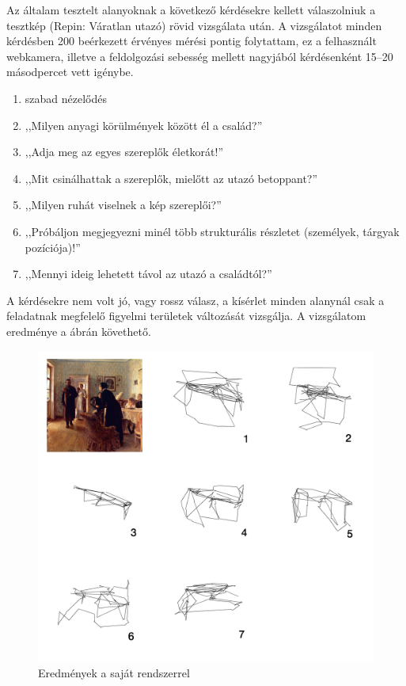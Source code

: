\bigskip

Az általam tesztelt alanyoknak a következő kérdésekre kellett válaszolniuk a tesztkép (Repin: Váratlan utazó) rövid vizsgálata után. A vizsgálatot minden kérdésben 200 beérkezett érvényes mérési pontig folytattam, ez a felhasznált webkamera, illetve a feldolgozási sebesség mellett nagyjából kérdésenként 15--20 másodpercet vett igénybe.

\begin{enumerate}
 \item szabad nézelődés
 \item ,,Milyen anyagi körülmények között él a család?''
 \item ,,Adja meg az egyes szereplők életkorát!''
 \item ,,Mit csinálhattak a szereplők, mielőtt az utazó betoppant?''
 \item ,,Milyen ruhát viselnek a kép szereplői?''
 \item ,,Próbáljon megjegyezni minél több strukturális részletet (személyek, tárgyak pozíciója)!''
 \item ,,Mennyi ideig lehetett távol az utazó a családtól?''
\end{enumerate}

A kérdésekre nem volt jó, vagy rossz válasz, a kísérlet minden alanynál csak a feladatnak megfelelő figyelmi területek változását vizsgálja. A vizsgálatom eredménye a  ábrán követhető.

\begin{figure}[!ht]
\centering
\includegraphics[width=140mm, keepaspectratio]{figures/yarbus_eredmeny.png}
\caption{Eredmények a saját rendszerrel}
\label{fig:eredmeny}
\end{figure}

